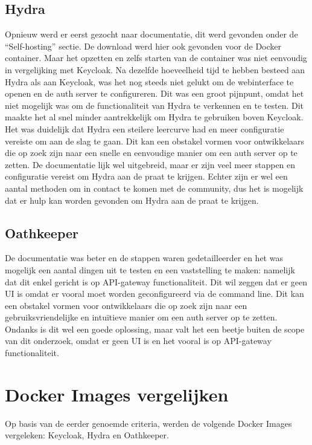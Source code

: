 \subsection{Hydra}%
\label{subsubsec:hydra}
Opnieuw werd er eerst gezocht naar documentatie, dit werd gevonden onder de ``Self-hosting'' sectie. De download werd hier ook gevonden voor de Docker container.
Maar het opzetten en zelfs starten van de container was niet eenvoudig in vergelijking met Keycloak. Na dezelfde hoeveelheid tijd te hebben besteed aan Hydra als aan Keycloak, was het nog steeds niet gelukt om de webinterface te openen en de auth server te configureren. 
Dit was een groot pijnpunt, omdat het niet mogelijk was om de functionaliteit van Hydra te verkennen en te testen. Dit maakte het al snel minder aantrekkelijk om Hydra te gebruiken boven Keycloak. Het was duidelijk dat Hydra een steilere leercurve had en meer configuratie vereiste om aan de slag te gaan. Dit kan een obstakel vormen voor ontwikkelaars die op zoek zijn naar een snelle en eenvoudige manier om een auth server op te zetten.
De documentatie lijk wel uitgebreid, maar er zijn veel meer stappen en configuratie vereist om Hydra aan de praat te krijgen. 
Echter zijn er wel een aantal methoden om in contact te komen met de community, dus het is mogelijk dat er hulp kan worden gevonden om Hydra aan de praat te krijgen.

\subsection{Oathkeeper}%
\label{subsubsec:oathkeeper}
De documentatie was beter en de stappen waren gedetailleerder en het was mogelijk een aantal dingen uit te testen en een vaststelling te maken: namelijk dat dit enkel gericht is op API-gateway functionaliteit. 
Dit wil zeggen dat er geen UI is omdat er vooral moet worden geconfigureerd via de command line. Dit kan een obstakel vormen voor ontwikkelaars die op zoek zijn naar een gebruiksvriendelijke en intuïtieve manier om een auth server op te zetten.
Ondanks is dit wel een goede oplossing, maar valt het een beetje buiten de scope van dit onderzoek, omdat er geen UI is en het vooral is op API-gateway functionaliteit.


\section{Docker Images vergelijken}%
\label{subsec:docker-images-vergelijken}
Op basis van de eerder genoemde criteria, werden de volgende Docker Images vergeleken: Keycloak, Hydra en Oathkeeper.

